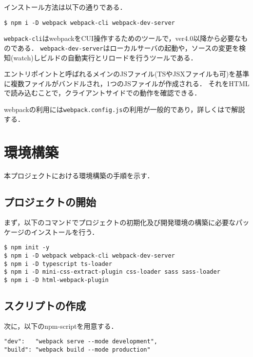 \documentclass[autodetect-engine,dvi=dvipdfmx,ja=standard,
               a4j,11pt]{bxjsarticle}
\newcommand{\secref}[1]{\makebox{第~\ref{#1}~章}}
\begin{document}
インストール方法は以下の通りである．

\begin{Verbatim}[numbers=none, xleftmargin=8mm, numbersep=6pt, fontsize=\small, baselinestretch=0.8]
$ npm i -D webpack webpack-cli webpack-dev-server
\end{Verbatim}
%
\verb|webpack-cli|はwebpackをCUI操作するためのツールで，ver4.0以降から必要なものである．
\verb|webpack-dev-server|はローカルサーバの起動や，ソースの変更を検知(watch)しビルドの自動実行とリロードを行うツールである．

エントリポイントと呼ばれるメインのJSファイル(TSやJSXファイルも可)を基準に複数ファイルがバンドルされ，1つのJSファイルが作成される．
それをHTMLで読み込むことで，クライアントサイドでの動作を確認できる．

webpackの利用には\verb|webpack.config.js|の利用が一般的であり，詳しくは\secref{sec:dev-env}で解説する．

\section{環境構築} \label{sec:dev-env}

本プロジェクトにおける環境構築の手順を示す\cite{www:8}．

\subsection{プロジェクトの開始}

まず，以下のコマンドでプロジェクトの初期化及び開発環境の構築に必要なパッケージのインストールを行う．

\begin{Verbatim}[numbers=none, xleftmargin=8mm, numbersep=6pt, fontsize=\small, baselinestretch=0.8]
$ npm init -y
$ npm i -D webpack webpack-cli webpack-dev-server
$ npm i -D typescript ts-loader
$ npm i -D mini-css-extract-plugin css-loader sass sass-loader
$ npm i -D html-webpack-plugin
\end{Verbatim}

\subsection{スクリプトの作成}

次に，以下のnpm-scriptを用意する．

\begin{Verbatim}[numbers=none, xleftmargin=8mm, numbersep=6pt, fontsize=\small, baselinestretch=0.8]
"dev":   "webpack serve --mode development",
"build": "webpack build --mode production"
\end{Verbatim}
%
\end{document}
